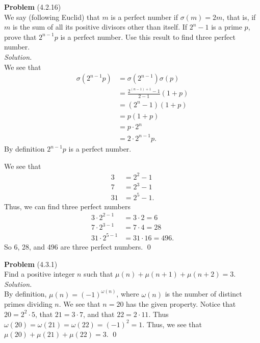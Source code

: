 \documentclass[12 pt]{amsart}
\begin{document}
\phantom{\quad} \vfill
\noindent
\textbf{Problem} (4.2.16) \\[4ex]
  We say (following Euclid) that $m$ is a perfect number if 
  $\sigma(m) = 2m$, that is, if $m$ is the sum of all its positive
  divisors other than itself.
  If $2^n - 1$ is a prime $p$, prove that $2^{n - 1}p$ is a perfect
  number.
  Use this result to find three perfect number.
  \\[2ex]
\emph{Solution.} \\[2ex]
  We see that 
  \begin{align*}
    \sigma(2^{n-1}p) &= \sigma(2^{n-1}) \sigma(p) \\
                     &= \frac{2^{(n-1)+1} - 1}{2-1} (1 + p) \\
                     &= (2^{n} - 1) (1 +p) \\
                     &= p (1 +p) \\
                     &= p \cdot 2^n \\
                     &= 2 \cdot 2^{n-1}p.
  \end{align*}
  By definition $2^{n-1}p$ is a perfect number.

  We see that 
  \begin{align*}
    3 &= 2^2 - 1 \\
    7 &= 2^3 - 1 \\
    31 &= 2^5 - 1.
  \end{align*}
  Thus, we can find three perfect numbers
  \begin{align*}
    3 \cdot 2^{2 - 1} &= 3 \cdot 2 = 6 \\
    7 \cdot 2^{3 - 1} &= 7 \cdot 4 = 28 \\
    31 \cdot 2^{5-1} &= 31 \cdot 16 = 496.
  \end{align*}
  So 6, 28, and 496 are three perfect numbers.
  \qed
\vfill
\newpage



\phantom{\quad} \vfill
\noindent
\textbf{Problem} (4.3.1) \\[4ex]
  Find a positive integer $n$ such that 
  $\mu(n) + \mu(n + 1) + \mu(n + 2) = 3$.
  \\[2ex]
\emph{Solution.} \\[2ex]
  By definition, 
  $\mu(n) = (-1)^{\omega(n)}$, where
  $\omega(n)$ is the number of distinct primes dividing $n$.
  We see that $n = 20$ has the given property.
  Notice that $20 = 2^2 \cdot 5$,
  that $21 = 3 \cdot 7$,
  and that $22 = 2 \cdot 11$.
  Thus $\omega(20) = \omega(21) = \omega(22) = (-1)^2 = 1$.
  Thus, we see that
  $\mu(20) + \mu(21) + \mu(22) = 3$. 
  \qed
\vfill
\newpage
\end{document}
